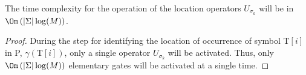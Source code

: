 \begin{lemma}\label{lem:U-sigma-time-complexity}
The time complexity for the operation of the location operators $U_{\sigma_k}$ will be in $\Om\left(\vert \Sigma \vert \log(M)\right)$.
\end{lemma}
\begin{proof}
During the step for identifying the location of occurrence of symbol $\mathrm{T}[i]$ in P, $\gamma(\mathrm{T}[i])$, only a single operator $U_{\sigma_k}$ will be activated. Thus, only $\Om\left(\vert \Sigma \vert\log(M)\right)$ elementary gates will be activated at a single time.
\end{proof}

